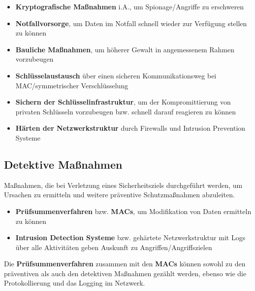 \begin{itemize}
    \itemsep0.5em
    \item \textbf{Kryptografische Maßnahmen} i.A., um Spionage/Angriffe zu erschweren
    \item \textbf{Notfallvorsorge}, um Daten im Notfall schnell wieder zur Verfügung stellen zu können
    \item \textbf{Bauliche Maßnahmen}, um höherer Gewalt in angemessenem Rahmen vorzubeugen
    \item \textbf{Schlüsselaustausch} über einen sicheren Kommunikationsweg bei MAC/symmetrischer Verschlüsselung
    \item \textbf{Sichern der Schlüsselinfrastruktur}, um der Kompromittierung von privaten Schlüsseln vorzubeugen bzw. schnell darauf reagieren zu können
    \item \textbf{Härten der Netzwerkstruktur} durch Firewalls und Intrusion Prevention Systeme
\end{itemize}

\subsection*{Detektive Maßnahmen}

Maßnahmen, die bei Verletzung eines Sicherheitsziels durchgeführt werden, um Ursachen zu ermitteln und weitere präventive Schutzmaßnahmen abzuleiten.

\begin{itemize}
    \itemsep0.5em
    \item \textbf{Prüfsummenverfahren} bzw. \textbf{MACs}, um Modifikation von Daten ermitteln zu können
    \item \textbf{Intrusion Detection Systeme} bzw. gehärtete Netzwerkstruktur mit Logs über alle Aktivitäten geben Auskunft zu Angriffen/Angriffszielen
\end{itemize}

\noindent
Die \textbf{Prüfsummenverfahren} zusammen mit den \textbf{MACs} können sowohl zu den präventiven als auch den detektiven Maßnahmen gezählt werden, ebenso wie die Protokollierung und das Logging im Netzwerk.
